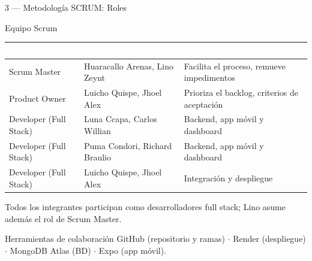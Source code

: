 \documentclass[aspectratio=169, 11pt]{beamer}
\begin{document}
\begin{frame}{3 — Metodología SCRUM: Roles}
    \vspace{-0.2cm}
    \begin{block}{Equipo Scrum}
        \footnotesize
        \begin{table}
        \scriptsize
        \begin{tabular}{|l|l|l|}
        \hline
        \rowcolor{azulin}
        \textcolor{white}{\textbf{Rol}} & \textcolor{white}{\textbf{Integrante}} & \textcolor{white}{\textbf{Función}} \\
        \hline
        Scrum Master & Huaracallo Arenas, Lino Zeynt & Facilita el proceso, remueve impedimentos \\
        \hline
        Product Owner & Luicho Quispe, Jhoel Alex & Prioriza el backlog, criterios de aceptación \\
        \hline
        Developer (Full Stack) & Luna Ccapa, Carlos Willian & Backend, app móvil y dashboard \\
        \hline
        Developer (Full Stack) & Puma Condori, Richard Braulio & Backend, app móvil y dashboard \\
        \hline
        Developer (Full Stack) & Luicho Quispe, Jhoel Alex & Integración y despliegue \\
        \hline
        \end{tabular}
        \end{table}
        \vspace{0.1cm}
        \scriptsize Todos los integrantes participan como desarrolladores full stack; Lino asume además el rol de Scrum Master.
    \end{block}
    \begin{block}{Herramientas de colaboración}
        \footnotesize
        GitHub (repositorio y ramas) $\cdot$ Render (despliegue) $\cdot$ MongoDB Atlas (BD) $\cdot$ Expo (app móvil).
    \end{block}
\end{frame}
\end{document}
